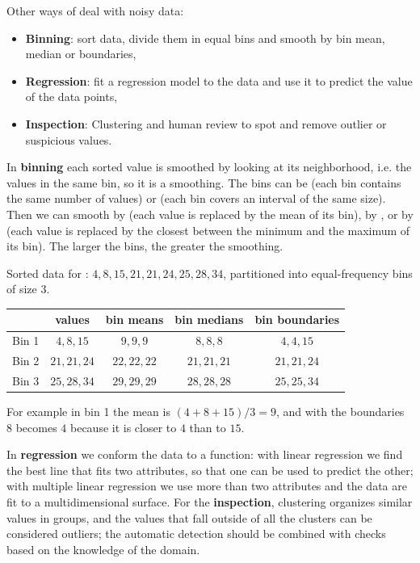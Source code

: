 Other ways of deal with noisy data:
\begin{itemize}
    \item \textbf{Binning}: sort data, divide them in equal bins and smooth by bin mean, median or boundaries,
    \item  \textbf{Regression}: fit a regression model to the data and use it to predict the value of the data points,
    \item \textbf{Inspection}: Clustering and human review to spot and remove outlier or suspicious values.
\end{itemize}

In \textbf{binning} each sorted value is smoothed by looking at its neighborhood, i.e. the values in the same bin, so it is a  smoothing. The bins can be  (each bin contains the same number of values) or  (each bin covers an interval of the same size). Then we can smooth by  (each value is replaced by the mean of its bin), by , or by  (each value is replaced by the closest between the minimum and the maximum of its bin). The larger the bins, the greater the smoothing.
\begin{example}[Binning]
    Sorted data for : $4, 8, 15, 21, 21, 24, 25, 28, 34$, partitioned into equal-frequency bins of size 3.
    \begin{center}
    \begin{tabular}{lcccc}
    \toprule
     & values & bin means & bin medians & bin boundaries \\
    \midrule
    Bin 1 & $4, 8, 15$ & $9, 9, 9$ & $8, 8, 8$ & $4, 4, 15$ \\
    Bin 2 & $21, 21, 24$ & $22, 22, 22$ & $21, 21, 21$ & $21, 21, 24$ \\
    Bin 3 & $25, 28, 34$ & $29, 29, 29$ & $28, 28, 28$ & $25, 25, 34$ \\
    \bottomrule
    \end{tabular}
    \end{center}
    For example in bin 1 the mean is $(4+8+15)/3=9$, and with the boundaries $8$ becomes $4$ because it is closer to $4$ than to $15$.
\end{example}
In \textbf{regression} we conform the data to a function: with linear regression we find the best line that fits two attributes, so that one can be used to predict the other; with multiple linear regression we use more than two attributes and the data are fit to a multidimensional surface. For the \textbf{inspection}, clustering organizes similar values in groups, and the values that fall outside of all the clusters can be considered outliers; the automatic detection should be combined with checks based on the knowledge of the domain.

